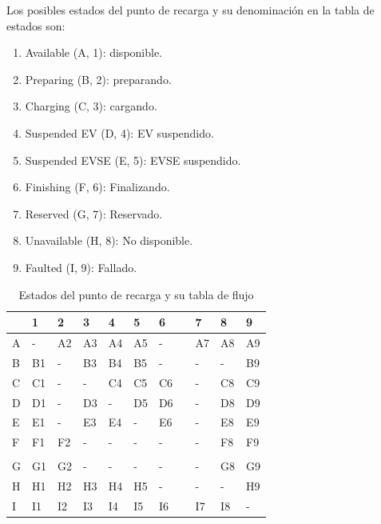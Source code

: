 \documentclass[12pt,a4paper,onecolumn,oneside]{report}
\begin{document}
Los posibles estados del punto de recarga y su denominación en la tabla de estados son:


\begin{enumerate}

\item Available (A, 1): disponible.
\item Preparing (B, 2): preparando.
\item Charging (C, 3): cargando.
\item Suspended EV (D, 4): EV suspendido.
\item Suspended EVSE (E, 5): EVSE suspendido.
\item Finishing (F, 6): Finalizando.
\item Reserved (G, 7): Reservado.
\item Unavailable (H, 8): No disponible.
\item Faulted (I, 9): Fallado.

\end{enumerate}


\begin{longtable}{|p{}|p{}|p{}|p{}|p{}|p{}|p{}|p{}|p{}|p{}|p{}|}
\caption{Estados del punto de recarga y su tabla de flujo}
\label{tablaestadospuntoderecarga}
\endfirsthead
\endhead
\hline
 & \hspace{0pt}1 & \hspace{0pt}2 & \hspace{0pt}3 & \hspace{0pt}4 & \hspace{0pt}5 & \hspace{0pt}6 &  & \hspace{0pt}7 & \hspace{0pt}8 & \hspace{0pt}9 \\ \hline
 A & - & A2 & A3 & A4 & A5 & - &  & A7 & A8 & A9 \\
 B & B1 & - & B3 & B4 & B5 & - &  & - & - & B9 \\
 C & C1 & - & - &  C4 & C5 & C6 &  & - & C8 & C9 \\ 
 D & D1 & - & D3 & - & D5 & D6 &  & - & D8 & D9 \\ 
 E & E1 & - & E3 & E4 & - & E6 &  & - & E8 & E9 \\ 
 F & F1 & F2 & - & - & - & - &  & - & F8 & F9 \\ 
  &  &  &  &  &  &  &  &  &  &  \\ 
 G & G1 & G2 & - & - & - & - &  & - & G8 & G9 \\ 
 H & H1 & H2 & H3 & H4 & H5 & - &  & - & - & H9 \\ 
 I & I1 & I2 & I3 & I4 & I5 & I6 &  & I7 & I8 & - \\ \hline
\end{longtable}
\end{document}

